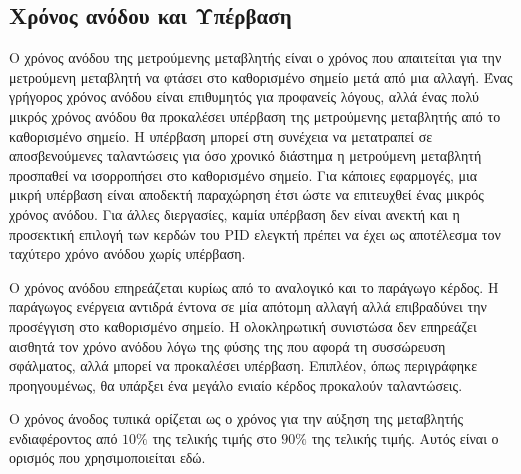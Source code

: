 \subsection{Χρόνος ανόδου και Υπέρβαση}

Ο χρόνος ανόδου της μετρούμενης μεταβλητής είναι ο χρόνος που απαιτείται για την μετρούμενη μεταβλητή να φτάσει στο καθορισμένο σημείο μετά από μια αλλαγή. Ένας γρήγορος χρόνος ανόδου είναι επιθυμητός για προφανείς λόγους, αλλά ένας πολύ μικρός χρόνος ανόδου θα προκαλέσει υπέρβαση της μετρούμενης μεταβλητής από το καθορισμένο σημείο. Η υπέρβαση μπορεί στη συνέχεια να μετατραπεί σε αποσβενούμενες ταλαντώσεις για όσο χρονικό διάστημα η μετρούμενη μεταβλητή προσπαθεί να ισορροπήσει στο καθορισμένο σημείο. Για κάποιες εφαρμογές, μια μικρή υπέρβαση είναι αποδεκτή παραχώρηση έτσι ώστε να επιτευχθεί ένας μικρός χρόνος ανόδου. Για άλλες διεργασίες, καμία υπέρβαση δεν είναι ανεκτή και η προσεκτική επιλογή των κερδών του PID ελεγκτή πρέπει να έχει ως αποτέλεσμα τον ταχύτερο χρόνο ανόδου χωρίς υπέρβαση. 

Ο χρόνος ανόδου επηρεάζεται κυρίως από το αναλογικό και το παράγωγο κέρδος. Η παράγωγος ενέργεια αντιδρά έντονα σε μία απότομη αλλαγή αλλά επιβραδύνει την προσέγγιση στο καθορισμένο σημείο. Η ολοκληρωτική συνιστώσα δεν επηρεάζει αισθητά τον χρόνο ανόδου λόγω της φύσης της που αφορά τη συσσώρευση σφάλματος, αλλά μπορεί να προκαλέσει υπέρβαση. Επιπλέον, όπως περιγράφηκε προηγουμένως, θα υπάρξει ένα μεγάλο ενιαίο κέρδος προκαλούν ταλαντώσεις. 

Ο χρόνος άνοδος τυπικά ορίζεται ως ο χρόνος για την αύξηση της μεταβλητής ενδιαφέροντος από $10\%$ της τελικής τιμής στο $90\%$ της τελικής τιμής. Αυτός είναι ο ορισμός που χρησιμοποιείται εδώ.


